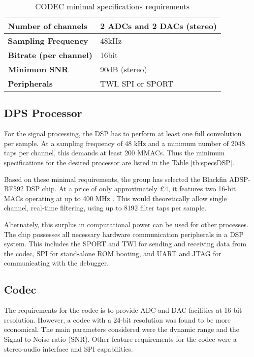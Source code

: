 \begin{table}[h]
	\centering
	\begin{tabular}{|l|l|}
		\hline
		\textbf{Number of channels}            & 2 ADCs and 2 DACs (stereo)                           \\ \hline
		\textbf{Sampling Frequency}            & 48kHz                            \\ \hline
		\textbf{Bitrate (per channel)}         & 16bit                            \\ \hline
		\textbf{Minimum SNR} & 90dB (stereo)                    \\ \hline
		\textbf{Peripherals}                   & TWI, SPI or SPORT \\ \hline
	\end{tabular}
	\caption{CODEC minimal specifications requirements}
	\label{tb:specsCodec}
\end{table}

\subsection{DPS Processor}
For the signal processing, the DSP has to perform at least one full convolution per sample. At a sampling frequency of 48 kHz and a minimum number of 2048 taps per channel, this demands at least 200 MMACs. Thus the minimum specifications for the desired processor are listed in the Table \ref{tb:specsDSP}.


Based on these minimal requirements, the group has selected the Blackfin ADSP-BF592 DSP chip. At a price of only approximately £4, it features two 16-bit MACs operating at up to 400 MHz \autocite{blackfinDSP} . This would theoretically allow single channel, real-time filtering, using up to 8192 filter taps per sample. 

Alternately, this surplus in computational power can be used for other processes. The chip possesses all necessary hardware communication peripherals in a DSP system. This includes the SPORT and TWI for sending and receiving data from the codec, SPI for stand-alone ROM booting, and UART and JTAG for communicating with the debugger.



\subsection{Codec}
The requirements for the codec is to provide ADC and DAC facilities at 16-bit resolution. However, a codec with a 24-bit resolution was found to be more economical. The main parameters considered were the dynamic range and the Signal-to-Noise ratio (SNR). Other feature requirements for the codec were a stereo-audio interface and SPI capabilities.

